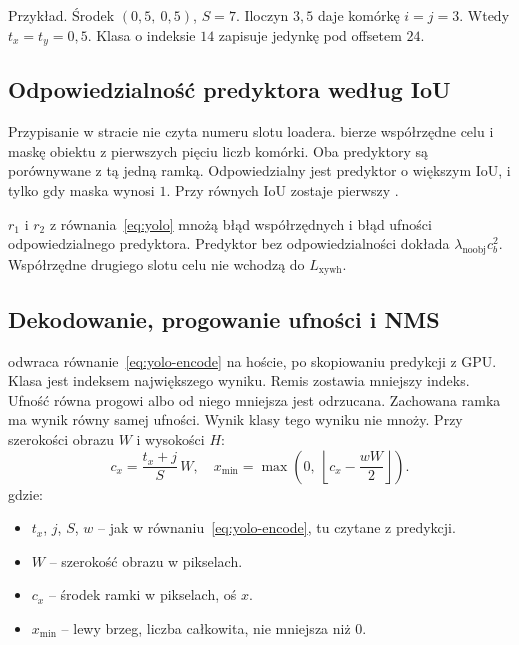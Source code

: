 Przykład. Środek \((0{,}5,\ 0{,}5)\), \(S = 7\). Iloczyn \(3{,}5\) daje komórkę \(i = j = 3\). Wtedy \(t_x = t_y = 0{,}5\). Klasa o indeksie \(14\) zapisuje jedynkę pod offsetem \(24\).

\subsection{Odpowiedzialność predyktora według IoU}

Przypisanie w stracie nie czyta numeru slotu loadera.  bierze współrzędne celu i maskę obiektu z pierwszych pięciu liczb komórki. Oba predyktory są porównywane z tą jedną ramką. Odpowiedzialny jest predyktor o większym IoU, i tylko gdy maska wynosi \(1\). Przy równych IoU zostaje pierwszy \cite{redmon2016yolo}.

\(r_1\) i \(r_2\) z równania~\eqref{eq:yolo} mnożą błąd współrzędnych i błąd ufności odpowiedzialnego predyktora. Predyktor bez odpowiedzialności dokłada \(\lambda_{\mathrm{noobj}} c_b^2\). Współrzędne drugiego slotu celu nie wchodzą do \(L_{\mathrm{xywh}}\).

\subsection{Dekodowanie, progowanie ufności i NMS}

 odwraca równanie~\eqref{eq:yolo-encode} na hoście, po skopiowaniu predykcji z GPU. Klasa jest indeksem największego wyniku. Remis zostawia mniejszy indeks. Ufność równa progowi albo od niego mniejsza jest odrzucana. Zachowana ramka ma wynik równy samej ufności. Wynik klasy tego wyniku nie mnoży. Przy szerokości obrazu \(W\) i wysokości \(H\):
\begin{equation}
\label{eq:yolo-decode}
c_x = \frac{t_x + j}{S}\, W,
\quad
x_{\min} = \max\left(0,\ \left\lfloor c_x - \frac{w W}{2} \right\rfloor\right).
\end{equation}
gdzie:
\begin{itemize}
\item \(t_x\), \(j\), \(S\), \(w\) -- jak w równaniu~\eqref{eq:yolo-encode}, tu czytane z predykcji.
\item \(W\) -- szerokość obrazu w pikselach.
\item \(c_x\) -- środek ramki w pikselach, oś \(x\).
\item \(x_{\min}\) -- lewy brzeg, liczba całkowita, nie mniejsza niż \(0\).
\end{itemize}

